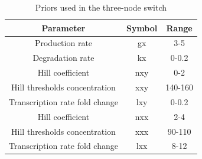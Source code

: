 \begin{table}[htpb]
\centering
\caption{Priors used in the three-node switch}
\label{tab:multi_priors}
\begin{tabular}{@{}ccc@{}}
\toprule
Parameter                           & Symbol & Range   \\ \midrule
Production rate                & gx        & 3-5    \\
Degradation rate               & kx        & 0-0.2     \\
Hill coefficient               & nxy       & 0-2    \\
Hill thresholds concentration  & xxy       & 140-160 \\
Transcription rate fold change & lxy       & 0-0.2     \\
Hill coefficient               & nxx       & 2-4     \\
Hill thresholds concentration  & xxx       & 90-110  \\
Transcription rate fold change & lxx       & 8-12    \\ \bottomrule
\end{tabular}
\end{table}

